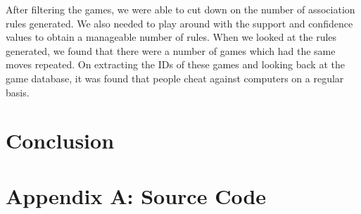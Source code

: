 \documentclass{article}
\begin{document}
After filtering the games, we were able to cut down on the number of association rules generated. We also needed to play around with the support and confidence values to obtain a manageable number of rules. When we looked at the rules generated, we found that there were a number of games which had the same moves repeated. On extracting the IDs of these games and looking back at the game database, it was found that people cheat against computers on a regular basis. \\



\section{Conclusion}
\section{Appendix A: Source Code}



\pagebreak


\end{document}
